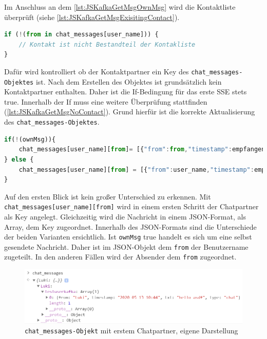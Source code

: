\documentclass[a4paper,titlepage,halfparskip,12pt]{scrreprt}
\begin{document}
\begin{onehalfspacing}
Im Anschluss an dem \autoref{lst:JSKafkaGetMsgOwnMsg} wird die Kontaktliste überprüft (siehe \autoref{lst:JSKafkaGetMsgExisitingContact}).
\begin{lstlisting}[language=Javascript,caption=Abfrage nach der eigenen Nachricht,label={lst:JSKafkaGetMsgExisitingContact}]
if (!(from in chat_messages[user_name])) {
	// Kontakt ist nicht Bestandteil der Kontakliste
}
\end{lstlisting}
Dafür wird kontrolliert ob der Kontaktpartner ein Key des \texttt{chat\_messages-Objektes} ist. Nach dem Erstellen des Objektes ist grundsätzlich kein Kontaktpartner enthalten. Daher ist die If-Bedingung für das erste \ac{SSE} stets true. Innerhalb der If muss eine weitere Überprüfung stattfinden (\autoref{lst:JSKafkaGetMsgNoContact}). Grund hierfür ist die korrekte Aktualisierung des \texttt{chat\_messages-Objektes}.
\begin{lstlisting}[language=Javascript,caption=Weitere Ausführung in Abhängigkeit des Empfängers,label={lst:JSKafkaGetMsgNoContact}]
if(!(ownMsg)){
	chat_messages[user_name][from]= [{"from":from,"timestamp":empfangenMsg.timestamp, "txt":empfangenMsg.msg, "type": "chat"}]
} else {
	chat_messages[user_name][from] = [{"from":user_name,"timestamp":empfangenMsg.timestamp, "txt":empfangenMsg.msg, "type": "chat"}]
}
\end{lstlisting}
Auf den ersten Blick ist kein großer Unterschied zu erkennen. Mit \texttt{chat\_messages[user\_name][from]} wird in einem ersten Schritt der Chatpartner als Key angelegt. Gleichzeitig wird die Nachricht in einem JSON-Format, als Array, dem Key zugeordnet. Innerhalb des JSON-Formats sind die Unterschiede der beiden Varianten ersichtlich. Ist \texttt{ownMsg} true handelt es sich um eine selbst gesendete Nachricht. Daher ist im JSON-Objekt dem \texttt{\dq from\dq} der Benutzername zugeteilt. In den anderen Fällen wird der Absender dem \texttt{\dq from\dq} zugeordnet.
\begin{figure}[h]
	\centering
	\includegraphics[scale=1.2]{images/Chat_messageObjectFirstInsertion}
	\caption{\texttt{chat\_messages-Objekt} mit erstem Chatpartner, eigene Darstellung}
	\label{img:Chat_messageObjectFirstInsertion}
\end{figure}

\end{onehalfspacing}
\end{document}
